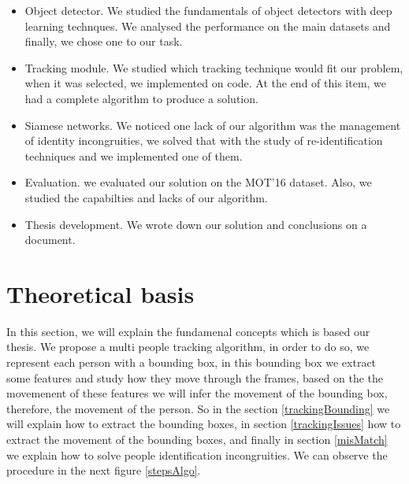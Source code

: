 \documentclass[12pt, a4paper, titlepage,twoside,openright]{article}
\begin{document}
\begin{itemize}


\item Object detector. We studied the fundamentals of object detectors with deep learning technques. We analysed the performance on the main datasets and finally, we chose one to our task.

\item Tracking module. We studied which tracking technique would fit our problem, when it was selected, we implemented on code. At the end of this item, we had a complete algorithm to produce a solution.

\item Siamese networks. We noticed one lack of our algorithm was the management of identity incongruities, we solved that with the study of re-identification techniques and we implemented one of them.

\item Evaluation. we evaluated our solution on the MOT'16 dataset. Also, we studied the capabilties and lacks of our algorithm.

\item Thesis development. We wrote down our solution and conclusions on a document.  

\end{itemize}



\section{Theoretical basis}\label{TheoriecArch}




In this section, we will explain the fundamenal concepts which is based our thesis. We propose a multi people tracking algorithm, in order to do so, we represent each person with a bounding box, in this bounding box we extract some features and study how they move through the frames, based on the the movemenent of these features we will infer the movement of the bounding box, therefore, the movement of the person. So in the section \ref{trackingBounding} we will explain how to extract the bounding boxes, in section \ref{trackingIssues} how to extract the movement of the bounding boxes, and finally in section \ref{misMatch} we explain how to solve people identification incongruities. We can observe the procedure in the next figure \ref{stepsAlgo}.
\end{document}
